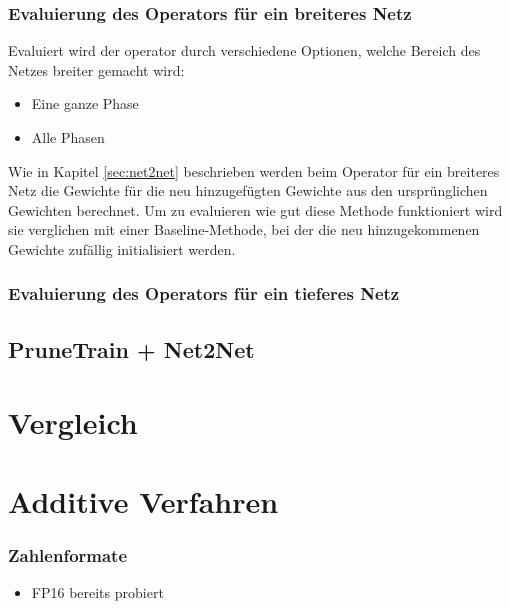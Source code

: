 \subsection{Evaluierung des Operators für ein breiteres Netz}
Evaluiert wird der operator durch verschiedene Optionen, welche Bereich des Netzes breiter gemacht wird:
\begin{itemize}
 \item Eine ganze Phase
 \item Alle Phasen
\end{itemize}
Wie in Kapitel \ref{sec:net2net} beschrieben werden beim Operator für ein breiteres Netz die Gewichte für die neu hinzugefügten Gewichte aus den ursprünglichen Gewichten berechnet. Um zu evaluieren wie gut diese Methode funktioniert wird sie verglichen mit einer Baseline-Methode, bei der die neu hinzugekommenen Gewichte zufällig initialisiert werden.
\subsection{Evaluierung des Operators für ein tieferes Netz}

\color{black}



\section{PruneTrain + Net2Net}\label{sec:ptpnet2net}


\chapter{Vergleich}\label{sec:vergleich}


\chapter{Additive Verfahren}

\subsection{Zahlenformate}\label{sec:zahlen}
\begin{itemize}
 \item FP16 bereits probiert
\end{itemize}


